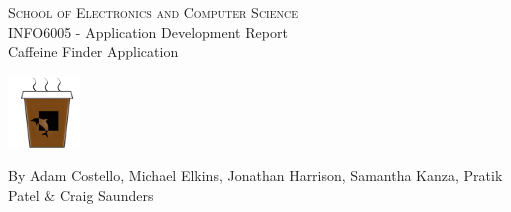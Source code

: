 
\begin{titlepage}
	
\begin{center}

\textsc{\huge{School of Electronics and Computer Science}}\\[2cm]

\huge{INFO6005 - Application Development Report}\\[5cm]

\LARGE{Caffeine Finder Application}

\begin{center}
\includegraphics[trim = 0mm 0mm 0mm 0mm, clip, scale=1.5]{Images/ic_launcher.png}
\end{center}

\vfill 

\LARGE{By Adam Costello, Michael Elkins, Jonathan Harrison, Samantha Kanza, Pratik Patel $\&$ Craig Saunders}

\end{center}

\end{titlepage}
